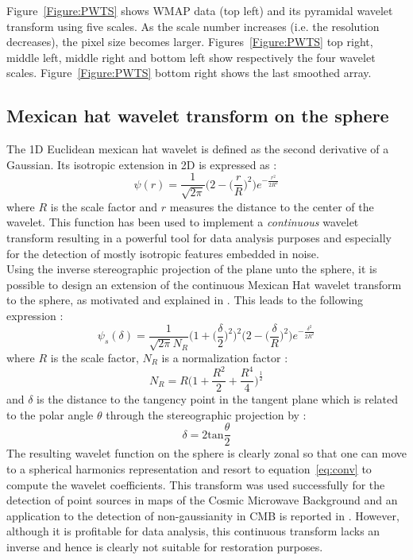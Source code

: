 { Figure~\ref{Figure:PWTS} shows WMAP data (top left) and its pyramidal wavelet transform using five scales. As the scale number increases 
(i.e. the resolution decreases), the pixel size becomes larger. Figures~\ref{Figure:PWTS} top right, middle left, middle right and bottom 
left show respectively the four wavelet scales. Figure~\ref{Figure:PWTS} bottom right shows the last smoothed array.}


\subsection{Mexican hat wavelet transform on the sphere}

The 1D Euclidean mexican hat wavelet is defined as the second derivative of a Gaussian. Its isotropic extension in 2D is expressed as :
\begin{equation}
\psi(r) = \frac{1}{\sqrt{2 \pi}} \Big( 2 - \Big( \frac{r}{R} \Big)^2 \Big) e^{- \frac{r^2}{2R^2}}
\end{equation}
where $R$ is the scale factor and $r$ measures the distance to the center of the wavelet. This function has been used to implement 
a \emph{continuous} wavelet transform resulting in a powerful tool for data analysis purposes and especially for the detection of 
mostly isotropic features embedded in noise.\\

Using the inverse stereographic projection of the plane unto the sphere, it is possible to design an extension of the continuous 
Mexican Hat wavelet transform to the sphere, as motivated and explained in \cite{wave:antoine99,wave:tenerio99,wave:cayon01,wave:holschneider96}. 
This leads to the following expression : 
\begin{equation}
\psi_s (\delta ) = \frac{1}{\sqrt{2 \pi} N_R} \Big( 1 +  \Big( \frac{\delta}{2} \Big)^2 \Big)^2   \Big( 2 - \Big( \frac{\delta}{R} \Big)^2 \Big) e^{- \frac{\delta^2}{2R^2}}
\end{equation}
where $R$ is the scale factor, $N_R$ is a normalization factor : 
\begin{equation}
N_R = R \Big( 1 + \frac{R^2}{2} + \frac{R^4}{4} \Big)^{\frac{1}{2}}
\end{equation}
and $\delta$ is the distance to the tangency point in the tangent plane which is related to the polar angle $\theta$ through the stereographic projection by :
\begin{equation}
\delta = 2 \textrm{tan} \frac{\theta}{2}
\end{equation}  
The resulting wavelet function on the sphere is clearly zonal so that one can move to a spherical harmonics representation and resort 
to equation~\ref{eq:conv} to compute the wavelet coefficients. This transform was used successfully for the detection of point sources 
in maps of the Cosmic Microwave Background and an application to the detection of non-gaussianity in  CMB is reported in \cite{wave:vielva04}. 
However, although it is profitable for data analysis, this continuous transform lacks an inverse and hence is clearly not suitable for restoration purposes. 



